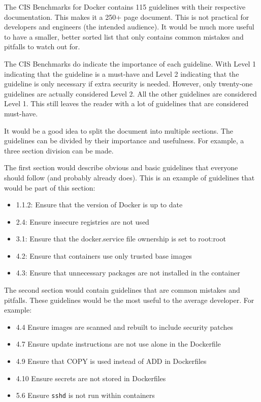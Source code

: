 The CIS Benchmarks for Docker contains 115 guidelines with their respective documentation.
This makes it a 250+ page document. This is not practical for developers and engineers (the intended audience). It would be much more useful to have a smaller, better sorted list that only contains common mistakes and pitfalls to watch out for.

\hfill

The CIS Benchmarks do indicate the importance of each guideline.
With Level 1 indicating that the guideline is a must-have and Level 2 indicating that the guideline is only necessary if extra security is needed. However, only twenty-one guidelines are actually considered Level 2. All the other guidelines are considered Level 1. This still leaves the reader with a lot of guidelines that are considered must-have.

\hfill

It would be a good idea to split the document into multiple sections. The guidelines can be divided by their importance and usefulness. For example, a three section division can be made.

\hfill

The first section would describe obvious and basic guidelines that everyone should follow (and probably already does). This is an example of guidelines that would be part of this section:
\begin{itemize}
    \item 1.1.2: Ensure that the version of Docker is up to date
    \item 2.4: Ensure insecure registries are not used
    \item 3.1: Ensure that the docker.service file ownership is set to root:root
    \item 4.2: Ensure that containers use only trusted base images
    \item 4.3: Ensure that unnecessary packages are not installed in the container
\end{itemize}

\hfill

The second section would contain guidelines that are common mistakes and pitfalls. These guidelines would be the most useful to the average developer. For example:
\begin{itemize}
    \item 4.4 Ensure images are scanned and rebuilt to include security patches
    \item 4.7 Ensure update instructions are not use alone in the Dockerfile
    \item 4.9 Ensure that COPY is used instead of ADD in Dockerfiles
    \item 4.10 Ensure secrets are not stored in Dockerfiles
    \item 5.6 Ensure \lstinline{sshd} is not run within containers
\end{itemize}

